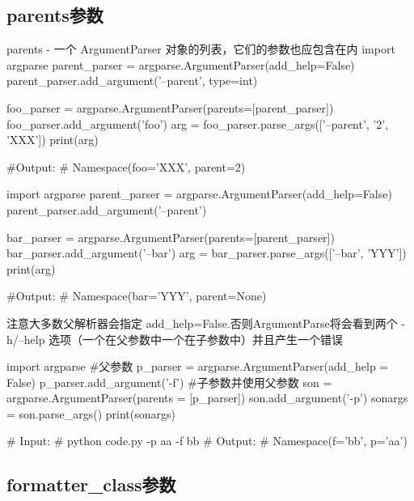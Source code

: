 \documentclass[11pt]{article}
\begin{document}
\subsection{parents参数}
 	\begin{Python}{parents - 一个 ArgumentParser 对象的列表，它们的参数也应包含在内}
import argparse
parent_parser = argparse.ArgumentParser(add_help=False)
parent_parser.add_argument('--parent', type=int)
 		
foo_parser = argparse.ArgumentParser(parents=[parent_parser])
foo_parser.add_argument('foo')
arg = foo_parser.parse_args(['--parent', '2', 'XXX'])
print(arg)
 	
#Output: 
#		Namespace(foo='XXX', parent=2)
 		
import argparse
parent_parser = argparse.ArgumentParser(add_help=False)
parent_parser.add_argument('--parent')
 		
bar_parser = argparse.ArgumentParser(parents=[parent_parser])
bar_parser.add_argument('--bar')
arg = bar_parser.parse_args(['--bar', 'YYY'])
print(arg)
 		
#Output:
#		Namespace(bar='YYY', parent=None)

注意大多数父解析器会指定 add_help=False.否则ArgumentParse将会看到两个 -h/--help 选项（一个在父参数中一个在子参数中）并且产生一个错误

import argparse
#父参数
p_parser = argparse.ArgumentParser(add_help = False)
p_parser.add_argument('-f')
#子参数并使用父参数
son = argparse.ArgumentParser(parents = [p_parser])
son.add_argument('-p')
sonargs = son.parse_args()
print(sonargs)
 		
# Input:
#		python code.py -p aa -f bb
# Output:
#		Namespace(f='bb', p='aa')
 	\end{Python}
 
\subsection{formatter\_class参数}
\end{document}
